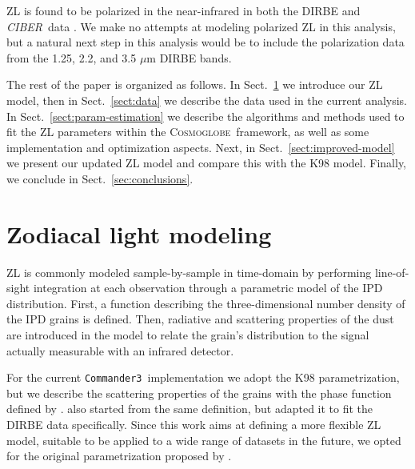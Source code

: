 \documentclass[twocolumn]{aa}
\def\commanderthree{\texttt{Commander3}}
\def\CIBER{\textit{CIBER}}
\newcommand{\cosmoglobe}{\textsc{Cosmoglobe}}
\begin{document}
ZL is found to be polarized in the near-infrared in both the DIRBE and 
\CIBER\ data \citep{Berriman94,Takimoto2022,Takimoto2023}. We make no attempts at 
modeling polarized ZL in this analysis, but a natural next step in this 
analysis would be to include the polarization data from the 1.25, 2.2, 
and 3.5 $\mu$m DIRBE bands.

The rest of the paper is organized as follows. In
Sect.~\ref{sect:zodi-model} we introduce our ZL model, then in Sect.~\ref{sect:data} 
we describe the data used in the current analysis. In 
Sect.~\ref{sect:param-estimation} we describe the algorithms and methods
used to fit the ZL parameters within the \cosmoglobe\  framework, as well as some 
implementation and optimization aspects. 
Next, in Sect.~\ref{sect:improved-model} we present our updated 
ZL model and compare this with the K98 model. Finally, we
conclude in Sect.~\ref{sec:conclusions}.


\section{Zodiacal light modeling}\label{sect:zodi-model}
ZL is commonly modeled sample-by-sample in time-domain by performing
line-of-sight integration at each observation through a parametric
model of the IPD distribution. First, a function describing the three-dimensional 
number density of the IPD grains is defined. Then, radiative and scattering properties 
of the dust are introduced in the model to relate the grain's distribution to the 
signal actually measurable with an infrared detector.

For the current \commanderthree\ implementation we adopt the K98 parametrization, 
but we describe the scattering properties of the grains with the phase function 
defined by \citet{Hong}. \citet{kelsall1998} also started from the same definition, 
but adapted it to fit the DIRBE data specifically. Since this work aims at defining a 
more flexible ZL model, suitable to be applied to a wide range of datasets in 
the future, we opted for the original parametrization proposed by \citet{Hong}.
\end{document}
